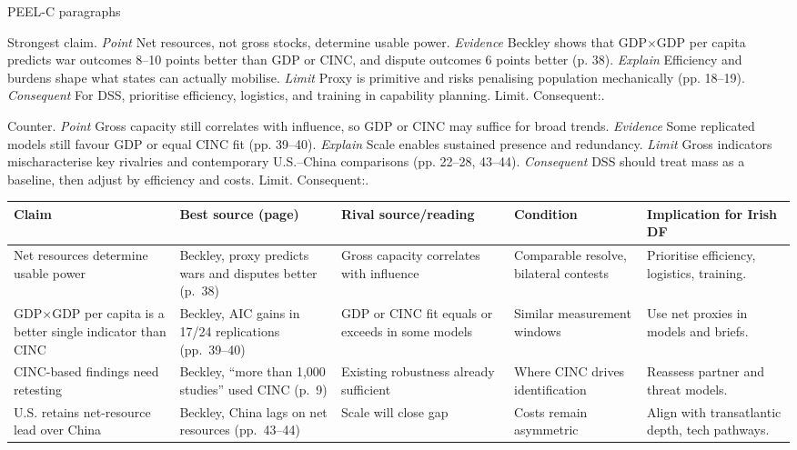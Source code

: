 PEEL-C paragraphs

Strongest claim. \textit{Point} Net resources, not gross stocks, determine usable power. \textit{Evidence} Beckley shows that GDP×GDP per capita predicts war outcomes 8–10 points better than GDP or CINC, and dispute outcomes 6 points better (p. 38). \textit{Explain} Efficiency and burdens shape what states can actually mobilise. \textit{Limit} Proxy is primitive and risks penalising population mechanically (pp. 18–19). \textit{Consequent} For DSS, prioritise efficiency, logistics, and training in capability planning. Limit. Consequent:.

Counter. \textit{Point} Gross capacity still correlates with influence, so GDP or CINC may suffice for broad trends. \textit{Evidence} Some replicated models still favour GDP or equal CINC fit (pp. 39–40). \textit{Explain} Scale enables sustained presence and redundancy. \textit{Limit} Gross indicators mischaracterise key rivalries and contemporary U.S.–China comparisons (pp. 22–28, 43–44). \textit{Consequent} DSS should treat mass as a baseline, then adjust by efficiency and costs. Limit. Consequent:.

\begin{tabular}{p{3.2cm}p{4.2cm}p{3.6cm}p{3.2cm}p{4.2cm}}
	\textbf{Claim} & \textbf{Best source (page)} & \textbf{Rival source/reading} & \textbf{Condition} & \textbf{Implication for Irish DF}\\\hline
	Net resources determine usable power & Beckley, proxy predicts wars and disputes better (p.~38) & Gross capacity correlates with influence & Comparable resolve, bilateral contests & Prioritise efficiency, logistics, training.\\
	GDP$\times$GDP per capita is a better single indicator than CINC & Beckley, AIC gains in 17/24 replications (pp.~39–40) & GDP or CINC fit equals or exceeds in some models & Similar measurement windows & Use net proxies in models and briefs.\\
	CINC-based findings need retesting & Beckley, “more than 1{,}000 studies” used CINC (p.~9) & Existing robustness already sufficient & Where CINC drives identification & Reassess partner and threat models.\\
	U.S. retains net-resource lead over China & Beckley, China lags on net resources (pp.~43–44) & Scale will close gap & Costs remain asymmetric & Align with transatlantic depth, tech pathways.\\
\end{tabular}

